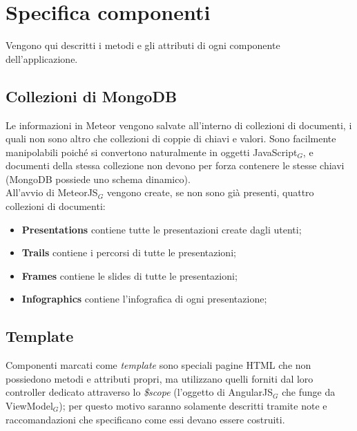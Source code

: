 \clearpage
\section{Specifica componenti}
Vengono qui descritti i metodi e gli attributi di ogni componente dell'applicazione. \\
\subsection{Collezioni di MongoDB} \label{collezioni}
Le informazioni in Meteor vengono salvate all'interno di collezioni di documenti, i quali non sono altro che collezioni di coppie di chiavi e valori. Sono facilmente manipolabili poiché si convertono naturalmente in oggetti JavaScript$_G$, e documenti della stessa collezione non devono per forza contenere le stesse chiavi (MongoDB possiede uno schema dinamico). \\
All'avvio di MeteorJS$_G$ vengono create, se non sono già presenti, quattro collezioni di documenti:
\begin{itemize}
\item \textbf{Presentations} contiene tutte le presentazioni create dagli utenti;
\item \textbf{Trails} contiene i percorsi di tutte le presentazioni;
\item \textbf{Frames} contiene le slides di tutte le presentazioni;
\item \textbf{Infographics} contiene l'infografica di ogni presentazione;
\end{itemize}

\subsection{Template}
Componenti marcati come \textit{template} sono speciali pagine HTML che non possiedono metodi e attributi propri, ma utilizzano quelli forniti dal loro controller dedicato attraverso lo \textit{\$scope} (l'oggetto di AngularJS$_G$ che funge da ViewModel$_G$); per questo motivo saranno solamente descritti tramite note e raccomandazioni che specificano come essi devano essere costruiti.
